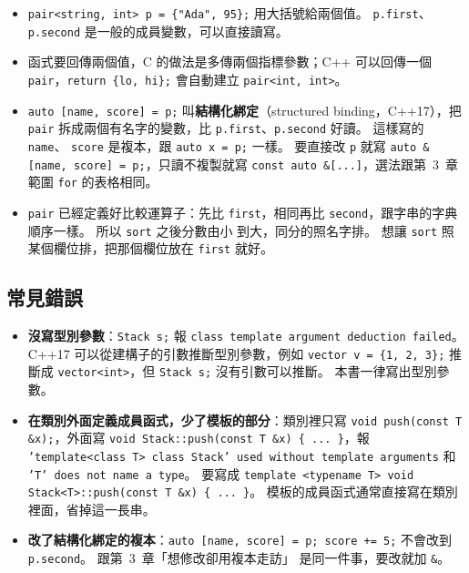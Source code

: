 
\begin{itemize}
\item \texttt{pair<string, int> p = \{"Ada", 95\};} 用大括號給兩個值。
\texttt{p.first}、\texttt{p.second} 是一般的成員變數，可以直接讀寫。
\item 函式要回傳兩個值，C 的做法是多傳兩個指標參數；C++ 可以回傳一個
\texttt{pair}，\texttt{return \{lo, hi\};} 會自動建立
\texttt{pair<int, int>}。
\item \texttt{auto [name, score] = p;} 叫\textbf{結構化綁定}（structured
binding，C++17），把 \texttt{pair} 拆成兩個有名字的變數，比
\texttt{p.first}、\texttt{p.second} 好讀。 這樣寫的 \texttt{name}、
\texttt{score} 是複本，跟 \texttt{auto x = p;} 一樣。 要直接改
\texttt{p} 就寫 \texttt{auto \&[name, score] = p;}，只讀不複製就寫
\texttt{const auto \&[...]}，選法跟第~3~章範圍 \texttt{for} 的表格相同。
\item \texttt{pair} 已經定義好比較運算子：先比 \texttt{first}，相同再比
\texttt{second}，跟字串的字典順序一樣。 所以 \texttt{sort} 之後分數由小
到大，同分的照名字排。 想讓 \texttt{sort} 照某個欄位排，把那個欄位放在
\texttt{first} 就好。
\end{itemize}

\subsection{常見錯誤}

\begin{itemize}
\item \textbf{沒寫型別參數}：\texttt{Stack s;} 報 \texttt{class template
argument deduction failed}。 C++17 可以從建構子的引數推斷型別參數，例如
\texttt{vector v = \{1, 2, 3\};} 推斷成 \texttt{vector<int>}，但
\texttt{Stack s;} 沒有引數可以推斷。 本書一律寫出型別參數。
\item \textbf{在類別外面定義成員函式，少了模板的部分}：類別裡只寫
\texttt{void push(const T \&x);}，外面寫
\texttt{void Stack::push(const T \&x) \{ ... \}}，報
\texttt{'template<class T> class Stack' used without template arguments}
和 \texttt{'T' does not name a type}。 要寫成
\texttt{template <typename T> void Stack<T>::push(const T \&x) \{ ... \}}。
模板的成員函式通常直接寫在類別裡面，省掉這一長串。
\item \textbf{改了結構化綁定的複本}：\texttt{auto [name, score] = p;
score += 5;} 不會改到 \texttt{p.second}。 跟第~3~章「想修改卻用複本走訪」
是同一件事，要改就加 \texttt{\&}。
\end{itemize}

